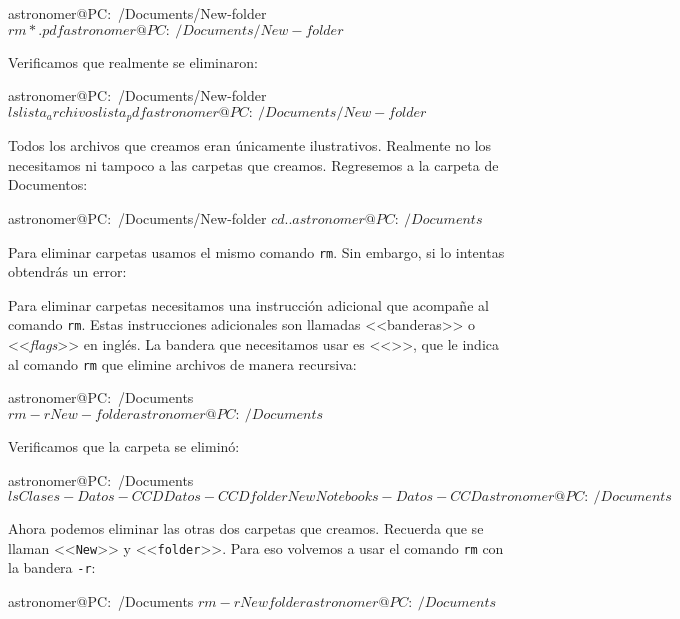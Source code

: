 \begin{bash}
astronomer@PC:~/Documents/New-folder $ rm *.pdf
astronomer@PC:~/Documents/New-folder $
\end{bash}
Verificamos que realmente se eliminaron:

\begin{bash}
astronomer@PC:~/Documents/New-folder $ ls 
lista_archivos  lista_pdf
astronomer@PC:~/Documents/New-folder $
\end{bash}

Todos los archivos que creamos eran únicamente ilustrativos. Realmente no los necesitamos ni tampoco a las carpetas que creamos. Regresemos a la carpeta de Documentos:

\begin{bash}
astronomer@PC:~/Documents/New-folder $ cd ..
astronomer@PC:~/Documents $
\end{bash}

Para eliminar carpetas usamos el mismo comando \texttt{rm}. Sin embargo, si lo intentas obtendrás un error:


Para eliminar carpetas necesitamos una instrucción adicional que acompañe al comando \texttt{rm}. Estas instrucciones adicionales son llamadas <<banderas>> o <<\emph{flags}>> en inglés. La bandera que necesitamos usar es <<>>, que le indica al comando \texttt{rm} que elimine archivos de manera recursiva:

\begin{bash}
astronomer@PC:~/Documents $ rm -r New-folder
astronomer@PC:~/Documents $ 
\end{bash}
Verificamos que la carpeta se eliminó:
\begin{bash}
astronomer@PC:~/Documents $ ls
Clases-Datos-CCD  Datos-CCD  folder  New  Notebooks-Datos-CCD
astronomer@PC:~/Documents $
\end{bash}

Ahora podemos eliminar las otras dos carpetas que creamos. Recuerda que se llaman <<\texttt{New}>> y <<\texttt{folder}>>. Para eso volvemos a usar el comando \texttt{rm} con la bandera \texttt{-r}:

\begin{bash}
astronomer@PC:~/Documents $ rm -r New folder
astronomer@PC:~/Documents $
\end{bash}

